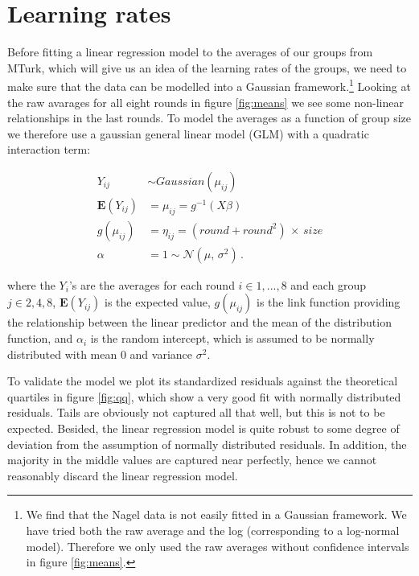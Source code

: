 \section{Learning rates}
Before fitting a linear regression model to the averages of our groups from MTurk, which will give us an idea of the learning rates of the groups, we need to make sure that the data can be modelled into a Gaussian framework.\footnote{We find that the Nagel data \cite{Nagel95} is not easily fitted in a Gaussian framework. We have tried both the raw average and the log (corresponding to a log-normal model). Therefore we only used the raw averages without confidence intervals in figure \ref{fig:means}.} Looking at the raw avarages for all eight rounds in figure \ref{fig:means} we see some non-linear relationships in the last rounds. To model the averages as a function of group size we therefore use a gaussian general linear model (GLM) \cite{Rcoreteam} with a quadratic interaction term:

\begin{equation}
\begin{split}
Y_{ij} &\sim Gaussian(\mu_{ij})  \\
\mathbf{E}(Y_{ij}) &= \mu_{ij}  = g^{-1}(X\beta) \\
g(\mu_{ij}) &= \eta_{ij} = (round + round^2) \, \times \, size  \\
\alpha &= 1 \sim \mathcal{N}(\mu,\,\sigma^{2})\,.
\label{eq:glm}
\end{split}
\end{equation}

where the $Y_i$'s are the averages for each round $i \in {1,..., 8}$ and each group $j \in {2,4,8}$, $\mathbf{E}(Y_{ij})$ is the expected value, $g(\mu_{ij})$ is the link function providing the relationship between the linear predictor and the mean of the distribution function, and
$\alpha_i$ is the random intercept, which is assumed to be normally distributed with mean $0$ and variance $\sigma^2$. 

To validate the model we plot its standardized residuals against the theoretical quartiles in figure \ref{fig:qq}, which show a very good fit with normally distributed residuals. Tails are obviously not captured all that well, but this is not to be expected. Besided, the linear regression model is quite robust to some degree of deviation from the assumption of normally distributed residuals. In addition, the majority in the middle values are captured near perfectly, hence we cannot reasonably discard the linear regression model.

